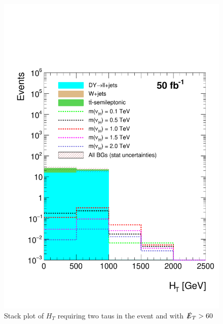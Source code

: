 \begin{figure}[H]
\centering
\includegraphics[width=\linewidth]{StackPlots/HT_2Taus_met60_50ifb_2moreSignals.pdf}
\caption{Stack plot of $H_{T}$ requiring two taus in the event and with $\slashed{E}_{T} > 60$}
\label{fig: HT2tausMet60}
\end{figure}



